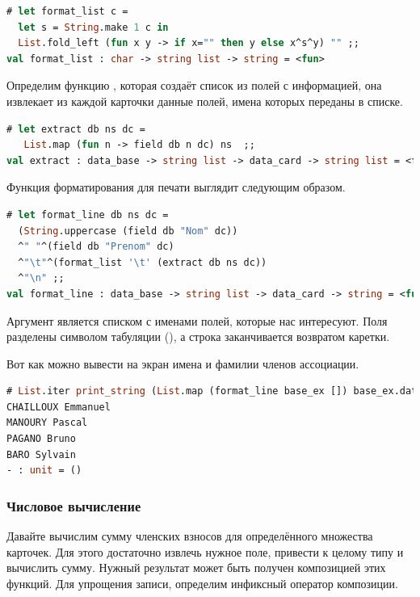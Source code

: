 \begin{lstlisting}[language=OCaml]
# let format_list c = 
  let s = String.make 1 c in  
  List.fold_left (fun x y -> if x="" then y else x^s^y) "" ;;
val format_list : char -> string list -> string = <fun>
\end{lstlisting}

Определим функцию , которая создаёт список из полей с 
информацией, она извлекает из каждой карточки данные полей, имена которых 
переданы в списке.

\begin{lstlisting}[language=OCaml]
# let extract db ns dc = 
   List.map (fun n -> field db n dc) ns  ;;
val extract : data_base -> string list -> data_card -> string list = <fun>
\end{lstlisting}

Функция форматирования для печати выглядит следующим образом.

\begin{lstlisting}[language=OCaml]
# let format_line db ns dc =
  (String.uppercase (field db "Nom" dc))
  ^" "^(field db "Prenom" dc)
  ^"\t"^(format_list '\t' (extract db ns dc))
  ^"\n" ;;
val format_line : data_base -> string list -> data_card -> string = <fun>
\end{lstlisting}

Аргумент  является списком с именами полей, которые нас интересуют. 
Поля разделены символом табуляции (), а строка заканчивается 
возвратом каретки.

Вот как можно вывести на экран имена и фамилии членов ассоциации.

\begin{lstlisting}[language=OCaml]
# List.iter print_string (List.map (format_line base_ex []) base_ex.data) ;;
CHAILLOUX Emmanuel	
MANOURY Pascal	
PAGANO Bruno	
BARO Sylvain	
- : unit = ()
\end{lstlisting}

\subsubsection{Числовое вычисление}

Давайте вычислим сумму членских взносов для определённого множества карточек. 
Для этого достаточно извлечь нужное поле, привести к целому типу и вычислить 
сумму. Нужный результат может быть получен композицией этих функций. Для 
упрощения записи, определим инфиксный оператор композиции.

